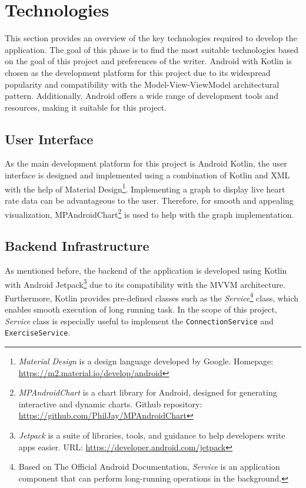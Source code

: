 \section{Technologies}
\label{chap:tech}
This section provides an overview of the key technologies required to develop the application. 
The goal of this phase is to find the most suitable technologies based on the goal of this project and preferences of the writer. 
Android with Kotlin is chosen as the development platform for this project due to its widespread popularity and compatibility with the Model-View-ViewModel architectural pattern. Additionally, Android offers a wide range of development tools and resources, making it suitable for this project.

\subsection{User Interface}
As the main development platform for this project is Android Kotlin, the user interface is designed and implemented using a combination of Kotlin and XML with the help of Material Design\footnote{\emph{Material Design} is a design language developed by Google. Homepage: \url{https://m2.material.io/develop/android}}.
Implementing a graph to display live heart rate data can be advantageous to the user. Therefore, for smooth and appealing visualization, MPAndroidChart\footnote{\emph{MPAndroidChart} is a chart library for Android, designed for generating interactive and dynamic charts. Github repository: \url{https://github.com/PhilJay/MPAndroidChart}} is used to help with the graph implementation.
\subsection{Backend Infrastructure}
As mentioned before, the backend of the application is developed using Kotlin with Android Jetpack\footnote{\emph{Jetpack} is a suite of libraries, tools, and guidance to help developers write apps easier. URL: \url{https://developer.android.com/jetpack}} due to its compatibility with the MVVM architecture. 
Furthermore, Kotlin provides pre-defined classes such as the \emph{Service}\footnote{Based on The Official Android Documentation, \emph{Service} is an application component that can perform long-running operations in the background.\autocite{android-services}} class, which enables smooth execution of long running task. In the scope of this project, \emph{Service} class is especially useful to implement the \texttt{ConnectionService} and \texttt{ExerciseService}.

